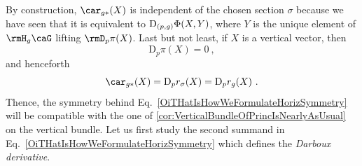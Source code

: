 \documentclass[reqno,a4paper,oneside]{amsart}
\theoremstyle{plain}
\theoremstyle{remark}
\theoremstyle{definition}
\begin{document}
By construction, $\car_{g*}(X)$ is independent of the chosen section $\sigma$ because we have seen that it is equivalent to $\mathrm{D}_{(p, g)}\Phi\mleft(X, Y \mright)$, where $Y$ is the unique element of $\rmH_g\caG$ lifting $\rmD_p\pi(X)$. Last but not least, if $X$ is a vertical vector, then
\begin{equation*}
\mathrm{D}_p\pi(X) = 0~,
\end{equation*}
and henceforth
\begin{equation*}
\car_{g*}(X)
=
\mathrm{D}_p r_\sigma (X)
=
\mathrm{D}_p r_g (X)~.
\end{equation*}
Thence, the symmetry behind Eq.\ \eqref{OiTHatIsHowWeFormulateHorizSymmetry} will be compatible with the one of \ref{cor:VerticalBundleOfPrincIsNearlyAsUsual} on the vertical bundle. Let us first study the second summand in Eq.\ \eqref{OiTHatIsHowWeFormulateHorizSymmetry} which defines the \textit{Darboux derivative}.
\end{document}
